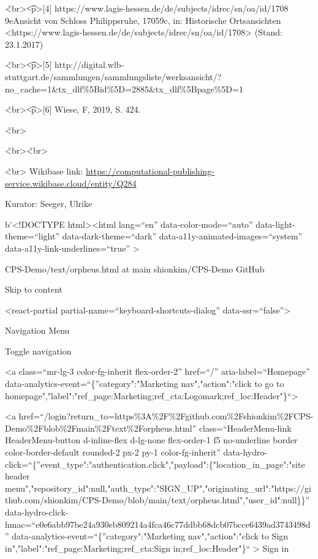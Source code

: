 \documentclass[
  letterpaper,
]{book}
\begin{document}
\r<br\textgreater{}\t<p\textgreater{[}4{]}
https://www.lagis-hessen.de/de/subjects/idrec/sn/oa/id/1708
\x9eAnsicht von Schloss Philippsruhe, 1705\x9c, in:
Historische Ortsansichten
\textless https://www.lagis-hessen.de/de/subjects/idrec/sn/oa/id/1708\textgreater{}
(Stand: 23.1.2017)

\r<br\textgreater{}\t<p\textgreater{[}5{]}
http://digital.wlb-stuttgart.de/sammlungen/sammlungsliste/werksansicht/?no\_cache=1\&tx\_dlf\%5Bid\%5D=2885\&tx\_dlf\%5Bpage\%5D=1

\r<br\textgreater{}\t<p\textgreater{[}6{]} Wiese, F\xbcrstensitz,
2019, S. 424.

\r<br\textgreater{}

\r<br\textgreater{}\r<br\textgreater{}

\r<br\textgreater{} Wikibase link:
\url{https://computational-publishing-service.wikibase.cloud/entity/Q284}

Kurator: Seeger, Ulrike

b'\textless!DOCTYPE html\textgreater{}\textless html lang=``en''
data-color-mode=``auto'' data-light-theme=``light''
data-dark-theme=``dark'' data-a11y-animated-images=``system''
data-a11y-link-underlines=``true'' \textgreater{}

CPS-Demo/text/orpheus.html at main  shionkim/CPS-Demo 
GitHub

Skip to content { {}}

\textless react-partial partial-name=``keyboard-shortcuts-dialog''
data-ssr=``false''\textgreater{}

Navigation Menu

{Toggle navigation}

\textless a class=``mr-lg-3 color-fg-inherit flex-order-2'' href=``/''
aria-label=``Homepage'' data-analytics-event=``\{''category":"Marketing
nav","action":"click to go to
homepage","label":"ref\_page:Marketing;ref\_cta:Logomark;ref\_loc:Header"\}``\textgreater{}

\textless a
href=``/login?return\_to=https\%3A\%2F\%2Fgithub.com\%2Fshionkim\%2FCPS-Demo\%2Fblob\%2Fmain\%2Ftext\%2Forpheus.html''
class=``HeaderMenu-link HeaderMenu-button d-inline-flex d-lg-none
flex-order-1 f5 no-underline border color-border-default rounded-2 px-2
py-1 color-fg-inherit''
data-hydro-click=``\{''event\_type":"authentication.click","payload":\{"location\_in\_page":"site
header
menu","repository\_id":null,"auth\_type":"SIGN\_UP","originating\_url":"https://github.com/shionkim/CPS-Demo/blob/main/text/orpheus.html","user\_id":null\}\}''
data-hydro-click-hmac=``e0e6abb97be24a930eb809214a4fca46c77ddbb68dcb07bcce6439ad3743498d''
data-analytics-event=``\{''category":"Marketing nav","action":"click to
Sign in","label":"ref\_page:Marketing;ref\_cta:Sign
in;ref\_loc:Header"\}`` \textgreater{} Sign in
\end{document}
